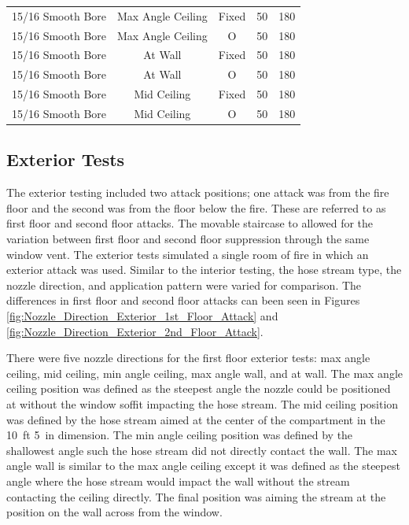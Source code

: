 \documentclass{book}
\begin{document}
\begin{table}[]
\begin{tabular}{ccccc}
15/16 Smooth Bore & Max Angle Ceiling   & Fixed   & 50 & 180 \\
15/16 Smooth Bore & Max Angle Ceiling   & O & 50  & 180 \\
15/16 Smooth Bore & At Wall     		& Fixed   & 50 & 180 \\
15/16 Smooth Bore & At Wall     		& O & 50  & 180 \\
15/16 Smooth Bore & Mid Ceiling 		& Fixed   & 50 & 180 \\
15/16 Smooth Bore & Mid Ceiling 		& O & 50  & 180 \\
\bottomrule[1.25pt]
\end{tabular}
\end{table}

\clearpage

\subsection{Exterior Tests}
\label{ext_tests}

The exterior testing included two attack positions; one attack was from the fire floor and the second was from the floor below the fire. These are referred to as first floor and second floor attacks. The movable staircase to allowed for the variation between first floor and second floor suppression through the same window vent. The exterior tests simulated a single room of fire in which an exterior attack was used. Similar to the interior testing, the hose stream type, the nozzle direction, and application pattern were varied for comparison. The differences in first floor and second floor attacks can been seen in Figures \ref{fig:Nozzle_Direction_Exterior_1st_Floor_Attack} and \ref{fig:Nozzle_Direction_Exterior_2nd_Floor_Attack}. 

There were five nozzle directions for the first floor exterior tests: max angle ceiling, mid ceiling, min angle ceiling, max angle wall, and at wall. The max angle ceiling position was defined as the steepest angle the nozzle could be positioned at without the window soffit impacting the hose stream. The mid ceiling position was defined by the hose stream aimed at the center of the compartment in the 10~ft 5~in dimension. The min angle ceiling position was defined by the shallowest angle such the hose stream did not directly contact the wall. The max angle wall is similar to the max angle ceiling except it was defined as the steepest angle where the hose stream would impact the wall without the stream contacting the ceiling directly. The final position was aiming the stream at the position on the wall across from the window.
\end{document}
